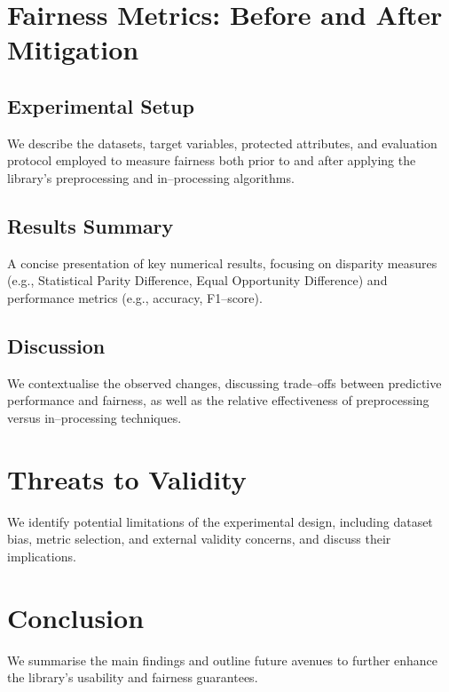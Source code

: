 \documentclass[12pt,a4paper,openright,twoside]{book}
\begin{document}



\section{Fairness Metrics: Before and After Mitigation}
\subsection{Experimental Setup}
We describe the datasets, target variables, protected attributes, and evaluation protocol employed to measure fairness both prior to and after applying the library's preprocessing and in--processing algorithms.

\subsection{Results Summary}
A concise presentation of key numerical results, focusing on disparity measures (e.g., Statistical Parity Difference, Equal Opportunity Difference) and performance metrics (e.g., accuracy, F1--score).

\subsection{Discussion}
We contextualise the observed changes, discussing trade--offs between predictive performance and fairness, as well as the relative effectiveness of preprocessing versus in--processing techniques.

\section{Threats to Validity}
We identify potential limitations of the experimental design, including dataset bias, metric selection, and external validity concerns, and discuss their implications.

\section{Conclusion}
We summarise the main findings and outline future avenues to further enhance the library's usability and fairness guarantees.
\end{document}
